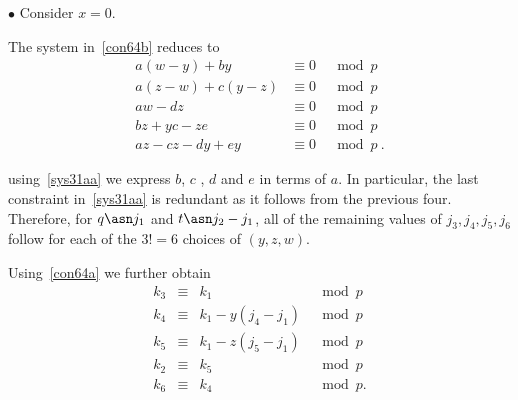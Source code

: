 $\bullet$ Consider $x=0$.


The system in~\eqref{con64b} reduces to
 \begin{equation}\label{sys31aa}\begin{array}{ccccc}
 a(w-y)+by &\equiv 0 &\mod p\\
 a(z-w)+c(y-z)  &\equiv 0 &\mod p\\
 aw-dz &\equiv 0 &\mod p\\
 bz+yc-ze &\equiv 0 &\mod p\\
 az-cz-dy+ey &\equiv 0 &\mod p~.
 \end{array}
 \end{equation}

using~\eqref{sys31aa} we express $b$, $c$ , $d$ and $e$ in terms
of $a$. In particular, the last constraint in~\eqref{sys31aa} is
redundant as it follows from the previous four. Therefore, for $q
\asn j_1$ and $t \asn j_2-j_1$, all of the remaining values of
$j_3,j_4,j_5,j_6$ follow for each of the $3!=6$ choices of
$(y,z,w)$.

Using~\eqref{con64a} we further obtain
\begin{equation}\begin{array}{ccccc}
k_3 & \equiv& k_1 &\mod p\\
k_4 & \equiv& k_1-y(j_4-j_1) &\mod p\\
k_5 &\equiv& k_1-z(j_5-j_1) &\mod p\\
k_2 &\equiv& k_5 &\mod p\\
k_6 &\equiv& k_4 &\mod p. \end{array}\end{equation}


